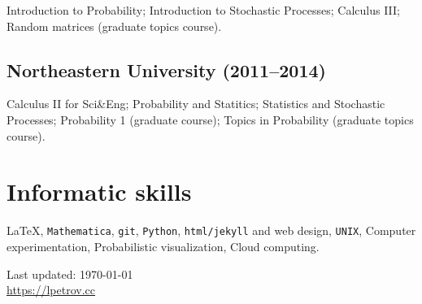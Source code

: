 \documentclass[letterpaper,11pt]{article}
\def\footerlink{https://lpetrov.cc}
\begin{document}
Introduction to
Probability; 
Introduction to
Stochastic Processes;
Calculus III;
Random matrices (graduate topics course).

\subsection*{Northeastern University (2011--2014)}

Calculus II for
Sci\&Eng;
Probability and
Statitics;
Statistics and
Stochastic Processes;
Probability 1
(graduate course);
Topics in Probability (graduate topics course).

\section*{Informatic skills}

\LaTeX, \texttt{Mathematica}, 
\texttt{git}, \texttt{Python},
\texttt{html/jekyll} and web design, \texttt{UNIX},
Computer experimentation,
Probabilistic visualization, 
Cloud computing.

\bigskip

\begin{center}
	\begin{footnotesize}
		Last updated: \today \\ \href{\footerlink}{\url{\footerlink}}
	\end{footnotesize}
\end{center}
\end{document}
